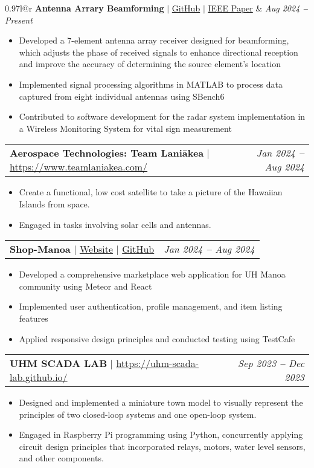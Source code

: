 \documentclass[letterpaper,11pt]{article}
\makeatletter
\newcommand{\resumeItem}[1]{
  \item\small{
    {#1 \vspace{-2pt}}
  }
}
\newcommand{\resumeProjectHeading}[2]{
    \vspace{-2pt}\item
    \begin{tabular*}{0.97\textwidth}{l@{\extracolsep{\fill}}r}
      \small#1 & #2 \\
    \end{tabular*}\vspace{-7pt}
}
\newcommand{\resumeItemListStart}{\begin{itemize}}
\newcommand{\resumeItemListEnd}{\end{itemize}\vspace{-5pt}}
\makeatother
\begin{document}
      \resumeProjectHeading
      {\textbf{Antenna Arrary Beamforming} $|$ {\href{https://github.com/XiaoKChenEdu/MICX_31XX}{GitHub}} $|$ {\href{https://ieeexplore-ieee-org.eres.library.manoa.hawaii.edu/stamp/stamp.jsp?tp=&arnumber=7347348&tag=1}{IEEE Paper}}}{\textit{Aug 2024 \textbf{--} Present}}
        \resumeItemListStart
          \resumeItem{Developed a 7-element antenna array receiver designed for beamforming, which adjusts the phase of received signals to enhance directional reception and improve the accuracy of determining the source element's location}
          \resumeItem{Implemented signal processing algorithms in MATLAB to process data captured from eight individual antennas using SBench6}
          \resumeItem{Contributed to software development for the radar system implementation in a Wireless Monitoring System for vital sign measurement}
        \resumeItemListEnd

      \resumeProjectHeading
      {\textbf{Aerospace Technologies: Team Laniākea} $|$ {\href{https://www.teamlaniakea.com/}{https://www.teamlaniakea.com/}}}{\textit{Jan 2024 \textbf{--} Aug 2024}}
        \resumeItemListStart
          \resumeItem{Create a functional, low cost satellite to take a picture of the Hawaiian Islands from space.}
          \resumeItem{Engaged in tasks involving solar cells and antennas.}
        \resumeItemListEnd
      
      \resumeProjectHeading
        {\textbf{Shop-Manoa} $|$ {\href{https://shop-manoa.github.io/}{Website}} $|$ {\href{https://github.com/shop-manoa/shop-manoa}{GitHub}}}{\textit{Jan 2024 \textbf{--} Aug 2024}}
          \resumeItemListStart
            \resumeItem{Developed a comprehensive marketplace web application for UH Manoa community using Meteor and React}
            \resumeItem{Implemented user authentication, profile management, and item listing features}
            \resumeItem{Applied responsive design principles and conducted testing using TestCafe}
          \resumeItemListEnd

      \resumeProjectHeading
        {\textbf{UHM SCADA LAB} $|$ {\href{https://uhm-scada-lab.github.io/}{https://uhm-scada-lab.github.io/}}}{\textit{Sep 2023 \textbf{--} Dec 2023}}
          \resumeItemListStart
            \resumeItem{Designed and implemented a miniature town model to visually represent the principles of two closed-loop systems and one open-loop system.}
            \resumeItem{Engaged in Raspberry Pi programming using Python, concurrently applying circuit design principles that incorporated relays, motors, water level sensors, and other components.}
          \resumeItemListEnd
\end{document}
